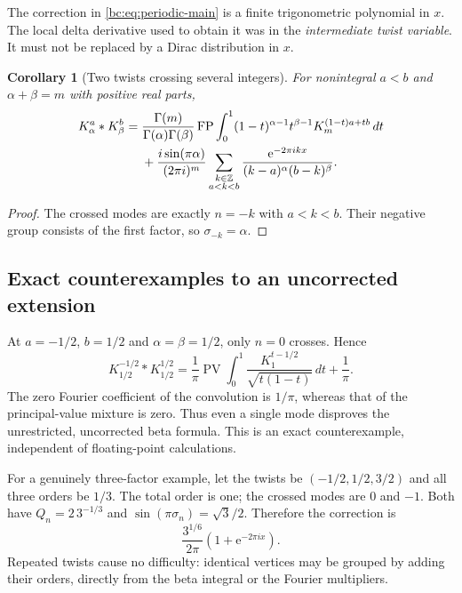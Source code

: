 \documentclass[11pt,letterpaper]{article}
\numberwithin{equation}{section}
\newtheorem{corollary}[theorem]{Corollary}
\theoremstyle{definition}
\theoremstyle{remark}
\newcommand{\bcFP}{\operatorname{FP}}
\newcommand{\bcPV}{\operatorname{PV}}
\newcommand{\bce}{\mathrm e}
\begin{document}
The correction in \eqref{bc:eq:periodic-main} is a finite trigonometric
polynomial in $x$. The local delta derivative used to obtain it was in
the \emph{intermediate twist variable}. It must not be replaced by a
Dirac distribution in $x$.

\begin{corollary}[Two twists crossing several integers]
\label{bc:cor:two-twists}
For nonintegral $a<b$ and $\alpha+\beta=m$ with positive real parts,
\begin{align}
 K_\alpha^a*K_\beta^b
 ={}&\frac{\Gamma(m)}{\Gamma(\alpha)\Gamma(\beta)}
 \bcFP\int_0^1(1-t)^{\alpha-1}t^{\beta-1}
                            K_m^{(1-t)a+tb}\,dt\notag\\
 &+\frac{i\sin(\pi\alpha)}{(2\pi i)^m}
     \sum_{\substack{k\in\mathbb Z\\a<k<b}}
       \frac{\bce^{-2\pi i kx}}{(k-a)^\alpha(b-k)^\beta}.
 \label{bc:eq:two-twist-main}
\end{align}
\end{corollary}
\begin{proof}
The crossed modes are exactly $n=-k$ with $a<k<b$. Their negative group
consists of the first factor, so $\sigma_{-k}=\alpha$.
\end{proof}

\subsection{Exact counterexamples to an uncorrected extension}

At $a=-1/2$, $b=1/2$ and $\alpha=\beta=1/2$, only $n=0$ crosses. Hence
\begin{equation}\label{bc:eq:half-counterexample}
 K_{1/2}^{-1/2}*K_{1/2}^{1/2}
 =\frac1\pi\bcPV\int_0^1
      \frac{K_1^{t-1/2}}{\sqrt{t(1-t)}}\,dt+\frac1\pi.
\end{equation}
The zero Fourier coefficient of the convolution is $1/\pi$, whereas
that of the principal-value mixture is zero. Thus even a single mode
disproves the unrestricted, uncorrected beta formula. This is an exact
counterexample, independent of floating-point calculations.

For a genuinely three-factor example, let the twists be
$(-1/2,1/2,3/2)$ and all three orders be $1/3$. The total order is one;
the crossed modes are $0$ and $-1$. Both have
$Q_n=2\,3^{-1/3}$ and $\sin(\pi\sigma_n)=\sqrt3/2$. Therefore the
correction is
\begin{equation}\label{bc:eq:three-example}
 \frac{3^{1/6}}{2\pi}\left(1+\bce^{-2\pi i x}\right).
\end{equation}
Repeated twists cause no difficulty: identical vertices may be grouped
by adding their orders, directly from the beta integral or the Fourier
multipliers.
\end{document}
